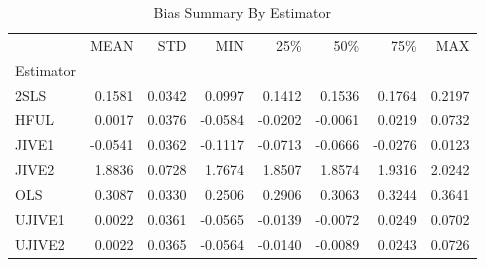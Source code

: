 \begin{table}[ht]
\centering
\caption{Bias Summary By Estimator}
\begin{tabular}{lrrrrrrr}
\toprule
 & MEAN & STD & MIN & 25\% & 50\% & 75\% & MAX \\
Estimator &  &  &  &  &  &  &  \\
\midrule
2SLS & 0.1581 & 0.0342 & 0.0997 & 0.1412 & 0.1536 & 0.1764 & 0.2197 \\
HFUL & 0.0017 & 0.0376 & -0.0584 & -0.0202 & -0.0061 & 0.0219 & 0.0732 \\
JIVE1 & -0.0541 & 0.0362 & -0.1117 & -0.0713 & -0.0666 & -0.0276 & 0.0123 \\
JIVE2 & 1.8836 & 0.0728 & 1.7674 & 1.8507 & 1.8574 & 1.9316 & 2.0242 \\
OLS & 0.3087 & 0.0330 & 0.2506 & 0.2906 & 0.3063 & 0.3244 & 0.3641 \\
UJIVE1 & 0.0022 & 0.0361 & -0.0565 & -0.0139 & -0.0072 & 0.0249 & 0.0702 \\
UJIVE2 & 0.0022 & 0.0365 & -0.0564 & -0.0140 & -0.0089 & 0.0243 & 0.0726 \\
\bottomrule
\end{tabular}
\end{table}
